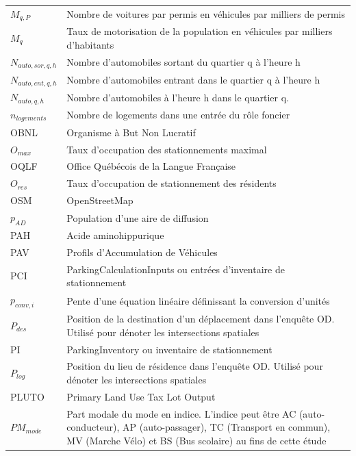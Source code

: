 \begin{longtable}{lp{5in}}
$M_{q,P}$ & Nombre de voitures par permis en véhicules par milliers de permis \\
$M_{q}$ & Taux de motorisation de la population en véhicules par milliers d'habitants \\
$N_{auto,sor,q,h}$ & Nombre d'automobiles sortant du quartier q à l'heure h \\
$N_{auto,ent,q,h}$ & Nombre d'automobiles entrant dans le quartier q à l'heure h\\
$N_{auto,q,h}$ & Nombre d'automobiles à l'heure h dans le quartier q. \\
$n_{logements}$ & Nombre de logements dans une entrée du rôle foncier\\
OBNL    & Organisme à But Non Lucratif                                                  \\
$O_{max}$ & Taux d'occupation des stationnements maximal \\
OQLF    & Office Québécois de la Langue Française                                       \\
$O_{res}$ & Taux d'occupation de stationnement des résidents \\
OSM     & OpenStreetMap                                                                 \\
$p_{AD}$ & Population d'une aire de diffusion\\
PAH     & Acide aminohippurique                                                         \\
PAV     & Profils d'Accumulation de Véhicules                                           \\
PCI     & ParkingCalculationInputs ou entrées d'inventaire de stationnement \\
$p_{conv,i}$ & Pente d'une équation linéaire définissant la conversion d'unités \\
$P_{des}$ & Position de la destination d'un déplacement dans l'enquête OD. Utilisé pour dénoter les intersections spatiales \\
PI      & ParkingInventory ou inventaire de stationnement                               \\
$P_{log}$ & Position du lieu de résidence dans l'enquête OD. Utilisé pour dénoter les intersections spatiales \\
PLUTO   & Primary Land Use Tax Lot Output                                               \\
$PM_{mode}$ & Part modale du mode en indice. L'indice peut être AC (auto-conducteur), AP (auto-passager), TC (Transport en commun), MV (Marche Vélo) et BS (Bus scolaire) au fins de cette étude \\

\end{longtable}
